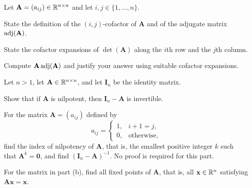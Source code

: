 \documentclass[11pt,oneside]{article}
\begin{document}
\begin{problem}
Let $\mathbf A=(a_{ij})\in\mathbb{R}^{n\times n}$ and let $i,j\in\{1,\dots,n\}$.
\begin{problemsubparts}
\item State the definition of the $(i,j)$-cofactor of $\mathbf A$ and of the adjugate matrix $\operatorname{adj}(\mathbf A)$.
\item State the cofactor expansions of $\det(\mathbf A)$ along the $i$th row and the $j$th column.
\item Compute $\mathbf A\operatorname{adj}(\mathbf A)$ and justify your answer using suitable cofactor expansions.
\end{problemsubparts}
\end{problem}

\begin{problem}
Let $n>1$, let $\mathbf A\in\mathbb{R}^{n\times n}$, and let $\mathbf I_n$ be the identity matrix.
\begin{problemsubparts}
\item Show that if $\mathbf A$ is nilpotent, then $\mathbf I_n-\mathbf A$ is invertible.
\item For the matrix $\mathbf A=(a_{ij})$ defined by
\[
a_{ij}=
\begin{cases}
1,&i+1=j,\\
0,&\text{otherwise},
\end{cases}
\]
find the index of nilpotency of $\mathbf A$, that is, the smallest positive integer $k$ such that $\mathbf A^k=\mathbf0$, and find $(\mathbf I_n-\mathbf A)^{-1}$. No proof is required for this part.
\item For the matrix in part \textup{(b)}, find all fixed points of $\mathbf A$, that is, all $\mathbf x\in\mathbb{R}^n$ satisfying $\mathbf A\mathbf x=\mathbf x$.
\end{problemsubparts}
\end{problem}
\end{document}
